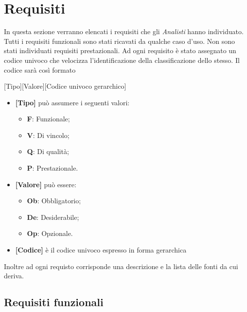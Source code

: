 \section{Requisiti}
In questa sezione verranno elencati i requisiti che gli \textit{Analisti} hanno individuato. 
Tutti i requisiti funzionali sono stati ricavati da qualche caso d'uso.
Non sono stati individuati requisiti prestazionali.
Ad ogni requisito è stato assegnato un codice univoco che velocizza l'identificazione della classificazione dello stesso.
Il codice sarà così formato
\begin{center}
[Tipo][Valore][Codice univoco gerarchico]
\end{center}
\begin{itemize}
\item \textbf{[Tipo]} può assumere i seguenti valori:
\begin{itemize}
	\item \textbf{F}: Funzionale;
	\item \textbf{V}: Di vincolo;
	\item \textbf{Q}: Di qualità;
	\item \textbf{P}: Prestazionale.
\end{itemize}
\item \textbf{[Valore]} può essere:
\begin{itemize}
	\item \textbf{Ob}: Obbligatorio;
	\item \textbf{De}: Desiderabile;
	\item \textbf{Op}: Opzionale.
\end{itemize}
\item \textbf{[Codice]} è il codice univoco espresso in forma gerarchica
\end{itemize}
Inoltre ad ogni requisto corrisponde una descrizione e la lista delle fonti da cui deriva.
\subsection{ Requisiti funzionali}
	

